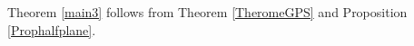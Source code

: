 \documentclass[reqno,12pt]{amsart}
\begin{document}
Theorem \ref{main3} follows from Theorem \ref{TheromeGPS} and Proposition \ref{Prophalfplane}. 













\end{document}
